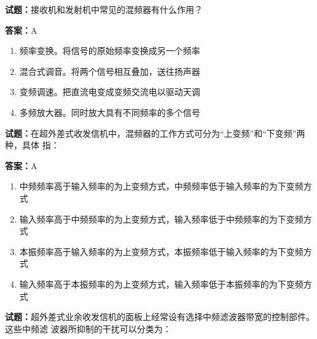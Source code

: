 \documentclass{ctexbook}
\begin{document}
\vspace{1em}

\textbf{试题：}接收机和发射机中常见的混频器有什么作用？ 

\textbf{答案：}A 

\begin{enumerate}[leftmargin=3em]
  \item 频率变换。将信号的原始频率变换成另一个频率 

  \item 混合式调音。将两个信号相互叠加，送往扬声器 

  \item 变频调速。把直流电变成变频交流电以驱动天调 

  \item 多频放大器。同时放大具有不同频率的多个信号 

\end{enumerate}





\vspace{1em}

\textbf{试题：}在超外差式收发信机中，混频器的工作方式可分为“上变频”和“下变频”两种，具体
指： 

\textbf{答案：}A 

\begin{enumerate}[leftmargin=3em]
  \item 中频频率高于输入频率的为上变频方式，中频频率低于输入频率的为下变频方式 

  \item 输入频率高于中频频率的为上变频方式，输入频率低于中频频率的为下变频方式 

  \item 本振频率高于输入频率的为上变频方式，本振频率低于输入频率的为下变频方式 

  \item 输入频率高于本振频率的为上变频方式，输入频率低于本振频率的为下变频方式 

\end{enumerate}





\vspace{1em}

\textbf{试题：}超外差式业余收发信机的面板上经常设有选择中频滤波器带宽的控制部件。这些中频滤
波器所抑制的干扰可以分类为： 
\end{document}
